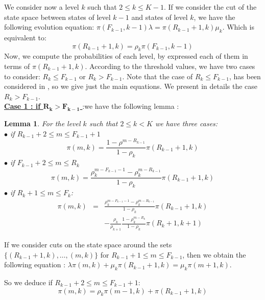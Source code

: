 \documentclass[conference]{IEEEtran}
\newtheorem{lem}{Lemma}
\begin{document}
We consider now a level $k$ such that $2 \leq  k \leq K-1$. If we consider the cut  of the state space between states of level $k-1$ and states of level $k$,  we have   the following  evolution equation: $\pi(F_{k-1},k-1) \lambda=  \pi(R_{k-1}+1,k) \mu_k$. Which is equivalent to:
\begin{equation}
\pi(R_{k-1}+1,k)= \rho_k \pi(F_{k-1},k-1)
\label{eq14b}
\end{equation}
Now, we compute the probabilities of each level, by
expressed  each of them in terms of  $\pi(R_{k-1}+1,k)$.  According to the threshold values,
we have two cases to consider:
$R_{k} \leq F_{k-1}$ or  $R_{k} > F_{k-1}$. Note that the case of $R_{k} \leq F_{k-1}$, has been considered in \cite{le2000simple}, so we give just the main equations. We present in details the case $R_{k} > F_{k-1}$. \\
\noindent
 \underline{{\textbf{Case 1 : if $\mathbf{R_{k} > F_{k-1}}$ }}}:we have the following lemma :
\begin{lem}
For the level $k$ such that  $2\leq k<K$ we have three cases: \\
$\bullet$ if $R_{k-1}+2 \leq m \leq F_{k-1}+1$
\begin{equation}
\pi(m,k)=\frac{1-\rho^{m-R_{k-1}} }{1-\rho_k}\pi(R_{k-1}+1,k) 
\label{eq40b}
\end{equation}
$\bullet$ if $F_{k-1}+2 \leq m \leq R_{k}$
\begin{equation}
\pi(m,k)= \frac{\rho_k^{m-F_{k-1}-1}-\rho_k^{m-R_{k-1}} } {1-\rho_k} \pi(R_{k-1}+1,k)
\label{eq31}
\end{equation}
$\bullet$ if  $R_k+1 \leq m \leq F_k$:
\begin{eqnarray}
\pi(m,k)&=& \frac{ \rho_k ^{m-F_{k-1}-1 } -\rho_k^{m-R_{k-1}} } {1-\rho_k} \pi(R_{k-1}+1,k) \nonumber \\
 &&- \frac{\rho_k}{\rho_{k+1}} \frac{1- \rho_k ^{m-R_k}} {1-\rho_k} \pi(R_{k}+1, k+1)
 \label{eq38}
\end{eqnarray}
\end{lem} 
If we consider cuts on the state space around the sets $\{(R_{k-1}+1,k), \ldots,(m,k)\}$ for  $R_{k-1}+1 \leq m \leq F_{k-1}$, then we obtain
the following equation : $\lambda \pi(m,k) + \mu_k \pi(R_{k-1}+1,k) = \mu_k \pi(m+1,k)$. 

So we deduce if $ R_{k-1}+2 \leq m \leq F_{k-1}+1$:
\begin{equation}
\pi(m,k) = \rho_k \pi(m-1,k)+ \pi(R_{k-1}+1,k)
\label{eq26b}
\end{equation}
\end{document}
